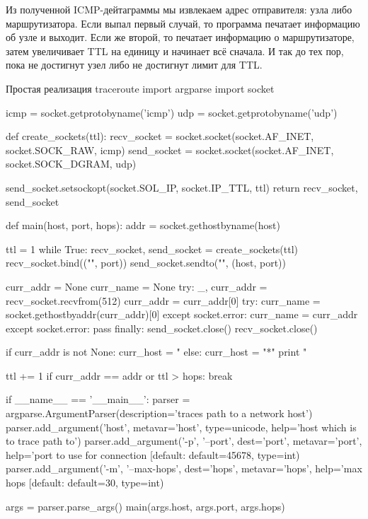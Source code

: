 Из полученной ICMP-дейтаграммы мы извлекаем адрес отправителя: узла либо маршрутизатора. Если выпал первый случай, то программа печатает информацию об узле и выходит. Если же второй, то печатает информацию о маршрутизаторе, затем увеличивает TTL на единицу и начинает всё сначала. И так до тех пор, пока не достигнут узел либо не достигнут лимит для TTL.

\begin{pylst}{Простая реализация traceroute}{}
import argparse
import socket

icmp = socket.getprotobyname('icmp')
udp = socket.getprotobyname('udp')

def create_sockets(ttl):
    recv_socket = socket.socket(socket.AF_INET, socket.SOCK_RAW, icmp)
    send_socket = socket.socket(socket.AF_INET, socket.SOCK_DGRAM, udp)

    send_socket.setsockopt(socket.SOL_IP, socket.IP_TTL, ttl)
    return recv_socket, send_socket

def main(host, port, hops):
    addr = socket.gethostbyname(host)

    ttl = 1
    while True:
        recv_socket, send_socket = create_sockets(ttl)
        recv_socket.bind(("", port))
        send_socket.sendto("", (host, port))

        curr_addr = None
        curr_name = None
        try:
            _, curr_addr = recv_socket.recvfrom(512)
            curr_addr = curr_addr[0]
            try:
                curr_name = socket.gethostbyaddr(curr_addr)[0]
            except socket.error:
                curr_name = curr_addr
        except socket.error:
            pass
        finally:
            send_socket.close()
            recv_socket.close()

        if curr_addr is not None:
            curr_host = "%
        else:
            curr_host = "*"
        print "%

        ttl += 1
        if curr_addr == addr or ttl > hops:
            break

if __name__ == '__main__':
    parser = argparse.ArgumentParser(description='traces path to a network host')
    parser.add_argument('host', metavar='host', type=unicode,
                        help='host which is to trace path to')
    parser.add_argument('-p', '--port', dest='port', metavar='port',
                        help='port to use for connection [default: %
                        default=45678, type=int)
    parser.add_argument('-m', '--max-hops', dest='hops', metavar='hops',
                        help='max hops [default: %
                        default=30, type=int)

    args = parser.parse_args()
    main(args.host, args.port, args.hops)
\end{pylst}

